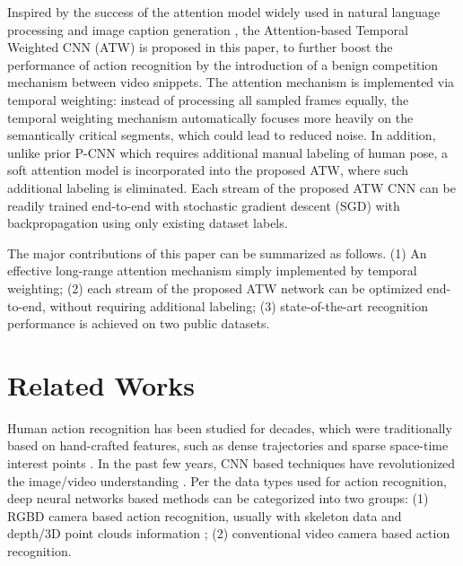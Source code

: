 \documentclass[runningheads,a4paper]{llncs}
\begin{document}
Inspired by the success of the attention model widely used in natural language processing \cite{luong2015effective} and image caption generation \cite{xu2015show,mnih2014recurrent}, the Attention-based Temporal Weighted CNN (ATW) is proposed in this paper, to further boost the performance of action recognition by the introduction of a benign competition mechanism between video snippets.  The attention mechanism is implemented via temporal weighting: instead of processing all sampled frames equally, the temporal weighting mechanism automatically focuses more heavily on the semantically critical segments, which could lead to reduced noise.  In addition, unlike prior P-CNN \cite{cheron2015p} which requires additional manual labeling of human pose, a soft attention model is incorporated into the proposed ATW, where such additional labeling is eliminated. Each stream of the proposed ATW CNN can be readily trained end-to-end with stochastic gradient descent (SGD) with backpropagation using only existing dataset labels.

The major contributions of this paper can be summarized as follows. (1) An effective long-range attention mechanism simply implemented by temporal weighting; (2) each stream of the proposed ATW network can be optimized end-to-end, without requiring additional labeling; (3) state-of-the-art recognition performance is achieved on two public datasets.


\section{Related Works}
%
Human action recognition has been studied for decades, which were traditionally based on hand-crafted features, such as dense trajectories \cite{wang2013action,wang2011action} and sparse space-time interest points \cite{laptev2005space}. In the past few years, CNN based techniques have revolutionized the image/video understanding \cite{ji20133d,simonyan2014two,karpathy2014large,yue2015beyond,wang2016temporal,carreira2017quo,donahue2015long,feichtenhofer2016convolutional,s17102421,s17061341}. Per the data types used for action recognition, deep neural networks based methods can be categorized into two groups: (1) RGBD camera based action recognition, usually with skeleton data and depth/3D point clouds information \cite{cheron2015p,wang2012mining,du2015hierarchical}; (2) conventional video camera based action recognition.
\end{document}
